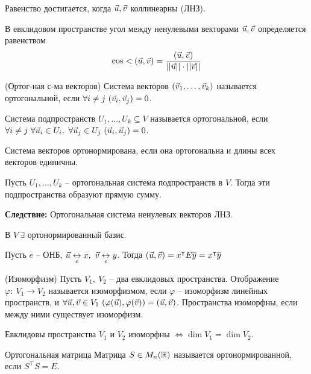 \begin{multicols}{2}
\begin{note}{}{}
    Равенство достигается, когда $\vec{u}, \vec{v}$ коллинеарны (ЛНЗ).
\end{note}
\begin{definition}{}{}
    В евклидовом пространстве угол между ненулевыми векторами $\vec{u}, \vec{v}$ определяется равенством 
    \[
        \cos < (\vec{u}, \vec{v}) = \dfrac{(\vec{u}, \vec{v})}{||\vec{u}|| \cdot ||\vec{v}||}  
    \]    
\end{definition}
\begin{definition}{(Ортог-ная с-ма векторов)}{}
    Система векторов $(\vec{v}_1, \ldots, \vec{v}_k)$ называется ортогональной, если $\forall i\neq j \ (\vec{v}_i, \vec{v}_j) = 0$.\par
    Система подпространств $U_1, \ldots, U_k \subseteq V$ называется ортогональной, если $\forall i\neq j\ \forall \vec{u}_i \in U_i, \ \forall \vec{u}_j \in U_j \ (\vec{u}_i, \vec{u}_j) = 0$.
\end{definition}
Система векторов ортонормирована, если она ортогональна и длины всех векторов единичны.
\begin{proposition}{}{}
    Пусть $U_1, \ldots, U_k$ -- ортогональная система подпространств в $V$. Тогда эти подпространства образуют прямую сумму.
\end{proposition}
\textbf{Следствие: } Ортогональная система ненулевых векторов ЛНЗ.
\begin{theorema}{}{}
    В $V \ \exists$ ортонормированный базис. 
\end{theorema}
\begin{note}{}{}
    Пусть $e$ -- ОНБ, $\vec{u} \underset{e}{\leftrightarrow} x, \ \vec{v} \underset{e}{\leftrightarrow} y$. Тогда $(\vec{u}, \vec{v}) = x^\intercal E \overline{y} = x^{\intercal}\overline{y}$
\end{note}
\begin{definition}{(Изоморфизм)}{}
    Пусть $V_1, \ V_2$ -- два евклидовых пространства. Отображение $\varphi: \ V_1 \to V_2$ называется изоморфизмом, если $\varphi$ -- изоморфизм линейных пространств, и $\forall \vec{u}, \vec{v} \in V_1\ (\varphi(\vec{u}), \varphi(\vec{v})) = (\vec{u}, \vec{v})$. Пространства изоморфны, если между ними существует изоморфизм.
\end{definition}
\begin{theorema}{}{}
    Евклидовы пространства $V_1$ и $V_2$ изоморфны $\Leftrightarrow \dim V_1 = \dim V_2$.
\end{theorema}
\begin{definition}{Ортогональная матрица}{}
    Матрица $S\in M_n(\mathbb{R})$ называется ортонормированной, если $S^\intercal S = E$.
\end{definition}

\end{multicols}
